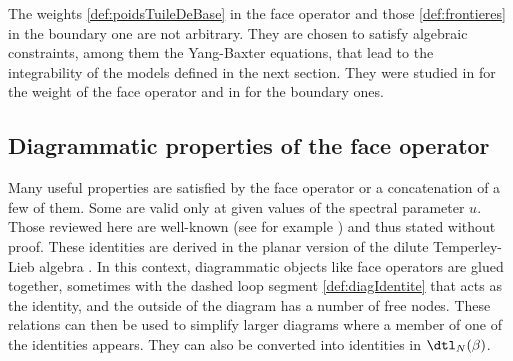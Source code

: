 \documentclass[11pt]{article}
\numberwithin{equation}{section}
\theoremstyle{alexi}
\begin{document}
The weights \eqref{def:poidsTuileDeBase} in the face operator and those \eqref{def:frontieres} in the boundary one are not arbitrary. They are chosen to satisfy algebraic constraints, among them the Yang-Baxter equations, that lead to the integrability of the models defined in the next section. They were studied in \cite{Nienhuis,IK81} for the weight of the face operator and in \cite{BatchelorYung,DJS10} for the boundary ones.

\subsection{Diagrammatic properties of the face operator}

Many useful properties are satisfied by the face operator or a concatenation of a few of them. Some are valid only at given values of the spectral parameter $u$. Those reviewed here are well-known (see for example \cite{AMDPP19}) and thus stated without proof.
These identities are derived in the planar version of the dilute Temperley-Lieb algebra \cite{VFRJ99}. In this context, diagrammatic objects like face operators are glued together, sometimes with the dashed loop segment \eqref{def:diagIdentite} that acts as the identity, and the outside of the diagram has a number of free nodes. These relations can then be used to simplify larger diagrams where a member of one of the identities appears. They can also be converted into identities in $\dtl_N(\beta)$.
\end{document}
